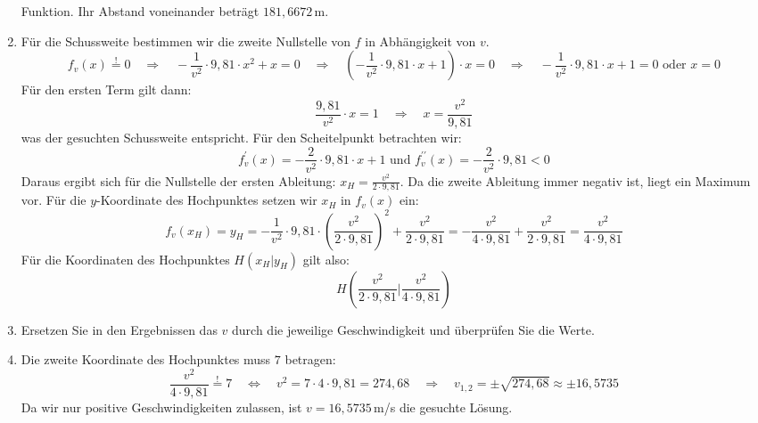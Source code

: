\documentclass[12pt,a4paper,twoside,fleqn]{article}
\begin{document}
\begin{solution}
\begin{enumerate}
    Funktion. Ihr Abstand voneinander beträgt $181,6672\,$m.
  \item Für die Schussweite bestimmen wir die zweite Nullstelle von
    $f$ in Abhängigkeit von $v$.
    $$f_v(x) \overset{!}{=} 0
    \quad \Rightarrow\quad 
    -\frac 1 {v^2} \cdot 9,81\cdot x^2 + x=0
    \quad \Rightarrow\quad 
    (-\frac 1 {v^2} \cdot 9,81\cdot x + 1)\cdot x=0
    \quad \Rightarrow\quad 
    -\frac 1 {v^2} \cdot 9,81\cdot x + 1 = 0 \textrm{ oder } x=0$$
    Für den ersten Term gilt dann:
    $$\frac {9,81} {v^2} \cdot x = 1 
    \quad\Rightarrow\quad
     x = \frac{v^2}{9,81} $$
     was der gesuchten Schussweite entspricht.
     Für den Scheitelpunkt betrachten wir:
     $$f^\prime_v(x)= - \frac 2 {v^2} \cdot 9,81 \cdot x + 1
     \textrm{ und }
     f^{\prime\prime}_v(x)= - \frac 2 {v^2} \cdot 9,81 <0$$
     Daraus ergibt sich für die Nullstelle der ersten Ableitung:
     $x_H= \frac {v^2}{ 2\cdot 9,81}$. Da die zweite Ableitung immer
     negativ ist, liegt ein Maximum vor. Für die $y$-Koordinate des
     Hochpunktes setzen wir $x_H$ in $f_v(x)$ ein:
     $$f_v(x_H)=y_H=
     -\frac 1 {v^2} \cdot 9,81\cdot 
     ( \frac {v^2}{ 2\cdot 9,81})^2 + \frac {v^2}{ 2\cdot 9,81} =
     -\frac {v^2}{4\cdot 9,81} +\frac {v^2}{ 2\cdot 9,81}
     = \frac {v^2}{ 4\cdot 9,81}
     $$
     Für die Koordinaten des Hochpunktes $H(x_H|y_H)$ gilt also:
     $$H\left(\frac {v^2}{ 2\cdot 9,81}\Big|\frac {v^2}{ 4\cdot 9,81}\right) $$
   \item Ersetzen Sie in den Ergebnissen das $v$ durch die jeweilige
     Geschwindigkeit und überprüfen Sie die Werte.
   \item Die zweite Koordinate des Hochpunktes muss $7$ betragen:
     $$\frac {v^2}{ 4\cdot 9,81} \overset{!}{=}7   
     \quad\Leftrightarrow\quad
     v^2 =7\cdot 4\cdot 9,81 = 274,68
     \quad\Rightarrow\quad
     v_{1,2}=\pm \sqrt{274,68}\approx\pm16,5735
     $$
     Da wir nur positive Geschwindigkeiten zulassen, ist
     $v=16,5735\,$m/s die gesuchte Lösung.
  \end{enumerate}
\end{solution}
\end{document}
